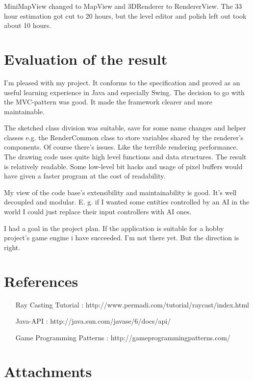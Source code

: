 \documentclass[a4paper,10pt]{article}
\begin{document}
MiniMapView changed to MapView and 3DRenderer to RendererView. The 33 hour
estimation got cut to 20 hours, but the level editor and polish left out
took about 10 hours.

\section{Evaluation of the result}

I'm pleased with my project. It conforms to the specification and proved as an
useful learning experience in Java and especially Swing. The decision to go
with the MVC-pattern was good. It made the framework clearer and more
maintainable.

The sketched class division was suitable, save for some name changes and helper
classes e.g. the RenderCommon class to store variables shared by the renderer's
components. Of course there's issues. Like the terrible rendering performance.
The drawing code uses quite high level functions and data structures. The
result is relatively readable. Some low-level bit hacks and usage of pixel
buffers would have given a faster program at the cost of readability.

My view of the code base's extensibility and maintainability is good. It's well
decoupled and modular. E. g. if I wanted some entities controlled by an AI in
the world I could just replace their input controllers with AI ones.

I had a goal in the project plan. If the application is suitable for a hobby
project's game engine i have succeeded. I'm not there yet. But the direction is
right.

\section{References}

\begin{itemize}
\item [Ray Casting Tutorial]: http://www.permadi.com/tutorial/raycast/index.html
\item [Java-API]: http://java.sun.com/javase/6/docs/api/
\item [Game Programming Patterns]: http://gameprogrammingpatterns.com/
\end{itemize}

\section{Attachments}
\end{document}
